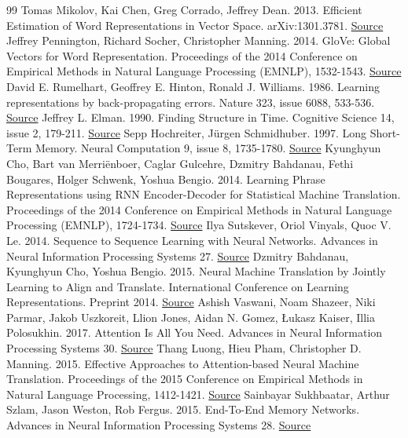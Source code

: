 \documentclass[10pt,letterpaper]{article}
\begin{document}
\begin{thebibliography}{99}
Tomas Mikolov, Kai Chen, Greg Corrado, Jeffrey Dean. 2013. Efficient Estimation of Word Representations in Vector Space. arXiv:1301.3781. \href{https://arxiv.org/abs/1301.3781}{Source}
Jeffrey Pennington, Richard Socher, Christopher Manning. 2014. GloVe: Global Vectors for Word Representation. Proceedings of the 2014 Conference on Empirical Methods in Natural Language Processing (EMNLP), 1532-1543. \href{https://aclanthology.org/D14-1162/}{Source}
David E. Rumelhart, Geoffrey E. Hinton, Ronald J. Williams. 1986. Learning representations by back-propagating errors. Nature 323, issue 6088, 533-536. \href{https://doi.org/10.1038/323533a0}{Source}
Jeffrey L. Elman. 1990. Finding Structure in Time. Cognitive Science 14, issue 2, 179-211. \href{https://doi.org/10.1207/s15516709cog1402_1}{Source}
Sepp Hochreiter, Jürgen Schmidhuber. 1997. Long Short-Term Memory. Neural Computation 9, issue 8, 1735-1780. \href{https://doi.org/10.1162/neco.1997.9.8.1735}{Source}
Kyunghyun Cho, Bart van Merriënboer, Caglar Gulcehre, Dzmitry Bahdanau, Fethi Bougares, Holger Schwenk, Yoshua Bengio. 2014. Learning Phrase Representations using RNN Encoder-Decoder for Statistical Machine Translation. Proceedings of the 2014 Conference on Empirical Methods in Natural Language Processing (EMNLP), 1724-1734. \href{https://aclanthology.org/D14-1179/}{Source}
Ilya Sutskever, Oriol Vinyals, Quoc V. Le. 2014. Sequence to Sequence Learning with Neural Networks. Advances in Neural Information Processing Systems 27. \href{https://arxiv.org/abs/1409.3215}{Source}
Dzmitry Bahdanau, Kyunghyun Cho, Yoshua Bengio. 2015. Neural Machine Translation by Jointly Learning to Align and Translate. International Conference on Learning Representations. Preprint 2014. \href{https://arxiv.org/abs/1409.0473}{Source}
Ashish Vaswani, Noam Shazeer, Niki Parmar, Jakob Uszkoreit, Llion Jones, Aidan N. Gomez, Łukasz Kaiser, Illia Polosukhin. 2017. Attention Is All You Need. Advances in Neural Information Processing Systems 30. \href{https://arxiv.org/abs/1706.03762}{Source}
Thang Luong, Hieu Pham, Christopher D. Manning. 2015. Effective Approaches to Attention-based Neural Machine Translation. Proceedings of the 2015 Conference on Empirical Methods in Natural Language Processing, 1412-1421. \href{https://aclanthology.org/D15-1166/}{Source}
Sainbayar Sukhbaatar, Arthur Szlam, Jason Weston, Rob Fergus. 2015. End-To-End Memory Networks. Advances in Neural Information Processing Systems 28. \href{https://arxiv.org/abs/1503.08895}{Source}

\end{thebibliography}
\end{document}
